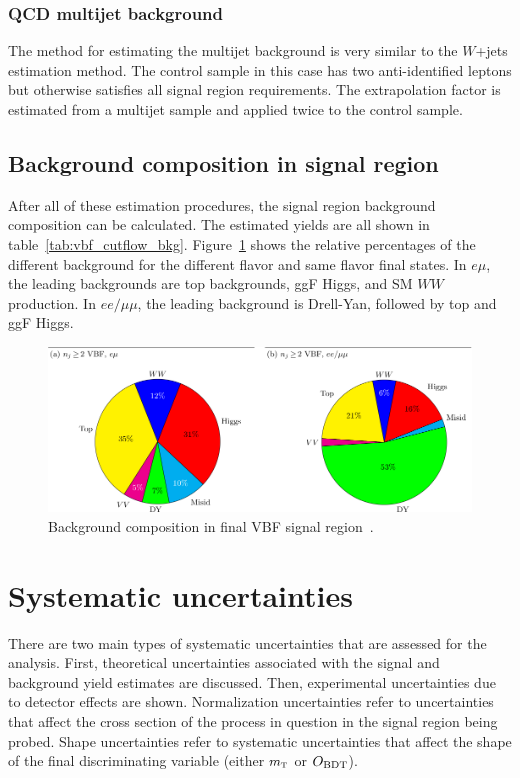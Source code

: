\subsubsection{QCD multijet background}

The method for estimating the multijet background is very similar to the $W$+jets estimation method. The control sample in this case has two anti-identified leptons but otherwise satisfies all signal region requirements. The extrapolation factor is estimated from a multijet sample and applied twice to the control sample. 

\subsection{Background composition in signal region}

After all of these estimation procedures, the signal region background composition can be calculated. The estimated yields are all shown in table~\ref{tab:vbf_cutflow_bkg}. Figure~\ref{fig:VBF_bkg_comp} shows the relative percentages of the different background for the different flavor and same flavor final states. In $e\mu$, the leading backgrounds are top backgrounds, ggF Higgs, and SM $WW$ production. In $ee/\mu\mu$, the leading background is Drell-Yan, followed by top and ggF Higgs.


\begin{figure}[h!]
  \centering
  \captionsetup{justification=centering}
  \includegraphics[width=\textwidth]{figures/VBF_bkg_comp}
  \caption{Background composition in final VBF signal region~\cite{WW2015}.}
  \label{fig:VBF_bkg_comp}
\end{figure}

\section{Systematic uncertainties}

There are two main types of systematic uncertainties that are assessed for the analysis. First, theoretical uncertainties associated with the signal and background yield estimates are discussed. Then, experimental uncertainties due to detector effects are shown. Normalization uncertainties refer to uncertainties that affect the cross section of the process in question in the signal region being probed. Shape uncertainties refer to systematic uncertainties that affect the shape of the final discriminating variable (either $m_{\textrm{\footnotesize\sc t}}$ or $O_{\rm BDT}$). 

